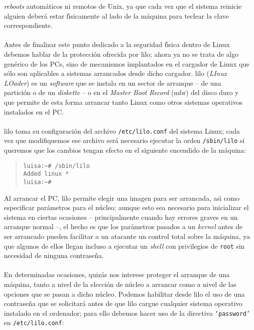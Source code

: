 {\it reboots} autom\'aticos ni remotos de Unix, ya que cada vez que el sistema 
reinicie alguien deber\'a estar f\'{\i}sicamente al lado de la m\'aquina para 
teclear la clave correspondiente.\\
\\Antes de finalizar este punto dedicado a la seguridad f\'{\i}sica dentro de
Linux debemos hablar de la protecci\'on ofrecida por {\sc lilo}; ahora ya no
se trata de algo gen\'erico de los PCs, sino de mecanismos implantados en el
cargador de Linux que s\'olo son aplicables a sistemas arrancados desde dicho 
cargador. {\sc lilo} ({\it LInux LOader}) es un {\it software} que se instala
en un sector de arranque -- de una partici\'on o de un {\it diskette} -- o en 
el {\it Master Boot Record} ({\sc mbr}) del disco duro y que permite de esta
forma arrancar tanto Linux como otros sistemas operativos instalados en el PC.\\
\\{\sc lilo} toma su configuraci\'on del archivo {\tt /etc/lilo.conf} del 
sistema Linux; cada vez que modifiquemos ese archivo ser\'a necesario ejecutar
la orden {\tt /sbin/lilo} si queremos que los cambios tengan efecto en el
siguiente encendido de la m\'aquina:
\begin{quote}
\begin{verbatim}
luisa:~# /sbin/lilo
Added linux *
luisa:~# 
\end{verbatim}
\end{quote}
Al arrancar el PC, {\sc lilo} permite elegir una imagen para ser arrancada, 
as\'{\i} como especificar pa\-r\'a\-me\-tros para el n\'ucleo; aunque esto sea
necesario para inicializar el sistema en ciertas ocasiones -- principalmente
cuando hay errores graves en un arranque normal --, el hecho es que los 
par\'ametros pasados a un {\it kernel} antes de ser arrancado pueden facilitar
a un atacante un control total sobre la m\'aquina, ya que algunos de ellos
llegan incluso a ejecutar un {\it shell} con privilegios de {\tt root} sin 
necesidad de ninguna contrase\~na.\\
\\En determinadas ocasiones, quiz\'as nos interese proteger el arranque de una
m\'aquina, tanto a nivel de la elecci\'on de n\'ucleo a arrancar como a nivel
de las opciones que se pasan a dicho n\'ucleo. Podemos habilitar desde {\sc
lilo} el uso de una contrase\~na que se solicitar\'a antes de que {\sc lilo} 
cargue cualquier sistema operativo instalado en el ordenador; para ello debemos
hacer uso de la directiva {\tt `password'} en {\tt /etc/lilo.conf}:
